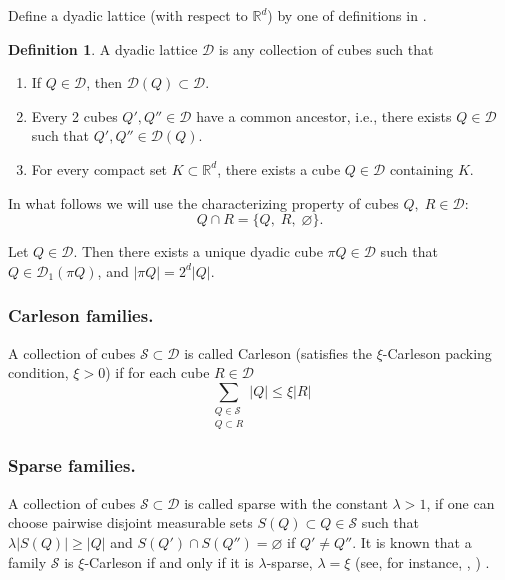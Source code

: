 \documentclass[12pt]{amsart} \setlength{\textwidth}{15cm} \setlength{\textheight}{24cm} \setlength{\voffset}{-1cm} \setlength{\oddsidemargin}{-0.4cm} \setlength{\evensidemargin}{-0.4cm}
\theoremstyle{definition}
\newtheorem{df}{Definition}
\theoremstyle{remark}
\newcommand{\rd}{\mathbb{R}^d}
\begin{document}
Define a dyadic lattice (with respect to $\rd$) by one of definitions in  \cite[\S 2]{LN}.
\begin{df}
  A dyadic lattice $\mathcal{D}$ is any collection of cubes such that
  \begin{enumerate}
    \item[DL1.]  If $ Q \in \mathcal{D}$, then $\mathcal{D}(Q) \subset \mathcal{D}$.

    \item[DL2.] Every 2 cubes $Q', Q''\in  \mathcal{D}$ have a common ancestor, i.e., there
exists $Q\in  \mathcal{D}$ such that $Q', Q''\in \mathcal{D}(Q)$.
    \item[DL3.] For every compact set $K \subset \rd$, there exists a cube $Q\in  \mathcal{D}$
containing $K$.
  \end{enumerate}
\end{df}
In what follows we will use the characterizing property of cubes $Q, \; R \in \mathcal{D}$:
\begin{equation}\label{dyp}
  Q\cap R= \{Q,\;R,\;  \varnothing\}.
\end{equation}

Let  $Q \in \mathcal{D}$. Then there exists a unique dyadic cube $\pi Q \in \mathcal{D}$
such that  $Q \in  \mathcal{D}_1(\pi Q)$, and $|\pi Q|=2^d|Q|$.

  \subsubsection{Carleson families. }A collection of cubes $\mathcal{S}\subset \mathcal{D}$ is called Carleson (satisfies the $\xi$-Carleson packing condition, $\xi >0$) if for each cube $R \in \mathcal{D} $
  \begin{equation}\label{e_carl}
    \sum _ {\substack {Q \in \mathcal{S}\\Q \subset R }}|Q|\leq \xi |R|
  \end{equation}
   \subsubsection{Sparse families. }A collection of cubes $\mathcal{S}\subset \mathcal{D}$ is called sparse  with the constant  $\lambda > 1$,
 if one can choose pairwise disjoint measurable sets
$S(Q) \subset Q \in \mathcal{S}$  such that  $\lambda |S(Q)|\geq  |Q|$ and $S(Q')\cap S(Q'')=\varnothing$ if $Q' \neq Q''$.
     It is known that a family $\mathcal{S}$   is $\xi$-Carleson if and only if it  is $\lambda$-sparse, $\lambda = \xi$ (see, for instance, \cite{VI},  \cite{ LN}) .
\end{document}
